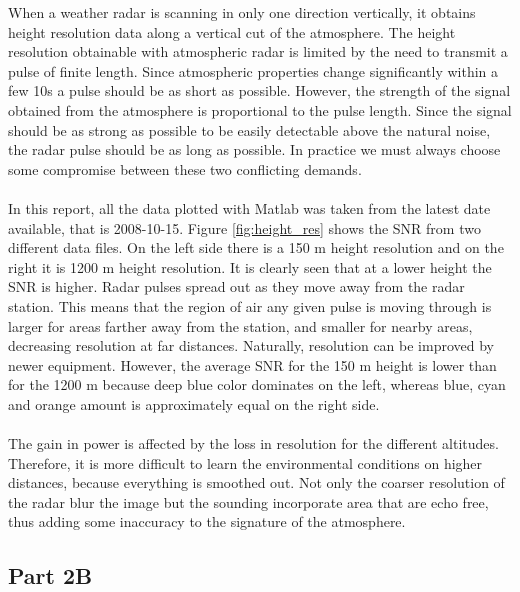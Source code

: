 \documentclass{article}
\begin{document}
When a weather radar is scanning in only one direction vertically, it obtains height resolution data along a vertical cut of the atmosphere. \cite{Wiki:2012wr} The height resolution obtainable with atmospheric radar is limited by the need to transmit a pulse of finite length. Since atmospheric properties change significantly within a few 10s a pulse should be as short as possible. However, the strength of the signal obtained from the atmosphere is proportional to the pulse length. Since the signal should be as strong as possible to be easily detectable above the natural noise, the radar pulse should be as long as possible. In practice we must always choose some compromise between these two conflicting demands. \cite{Enmark:2012a2}\\
\\
In this report, all the data plotted with Matlab was taken from the latest date available, that is 2008-10-15. Figure \ref{fig:height_res} shows the SNR from two different data files. On the left side there is a 150 m height resolution and on the right it is 1200 m height resolution. It is clearly seen that at a lower height the SNR is higher. Radar pulses spread out as they move away from the radar station. This means that the region of air any given pulse is moving through is larger for areas farther away from the station, and smaller for nearby areas, decreasing resolution at far distances. Naturally, resolution can be improved by newer equipment. \cite{Wiki:2012wr} However, the average SNR for the 150 m height is lower than for the 1200 m because deep blue color dominates on the left, whereas blue, cyan and orange amount is approximately equal on the right side.\\
\\
The gain in power is affected by the loss in resolution for the different altitudes. Therefore, it is more difficult to learn the environmental conditions on higher distances, because everything is smoothed out. Not only the coarser resolution of the radar blur the image but the sounding incorporate area that are echo free, thus adding some inaccuracy to the signature of the atmosphere. \cite{Wiki:2012wr}



\subsection{Part 2B}
\end{document}
